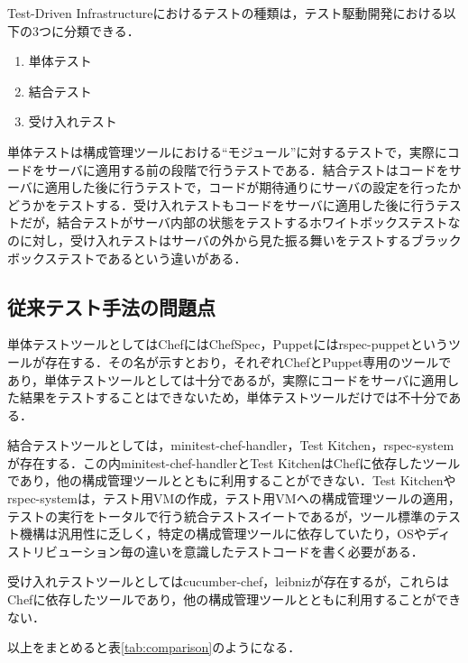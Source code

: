 Test-Driven Infrastructureにおけるテストの種類は，テスト駆動開発における以下の3つに分類できる．

\begin{enumerate}
  \item 単体テスト
  \item 結合テスト
  \item 受け入れテスト
\end{enumerate}

単体テストは構成管理ツールにおける``モジュール''に対するテストで，実際にコードをサーバに適用する前の段階で行うテストである．結合テストはコードをサーバに適用した後に行うテストで，コードが期待通りにサーバの設定を行ったかどうかをテストする．受け入れテストもコードをサーバに適用した後に行うテストだが，結合テストがサーバ内部の状態をテストするホワイトボックステストなのに対し，受け入れテストはサーバの外から見た振る舞いをテストするブラックボックステストであるという違いがある．

\subsection{従来テスト手法の問題点}

単体テストツールとしてはChefにはChefSpec，Puppetにはrspec-puppetというツールが存在する．その名が示すとおり，それぞれChefとPuppet専用のツールであり，単体テストツールとしては十分であるが，実際にコードをサーバに適用した結果をテストすることはできないため，単体テストツールだけでは不十分である．

結合テストツールとしては，minitest-chef-handler，Test Kitchen，rspec-systemが存在する．この内minitest-chef-handlerとTest KitchenはChefに依存したツールであり，他の構成管理ツールとともに利用することができない．Test Kitchenやrspec-systemは，テスト用VMの作成，テスト用VMへの構成管理ツールの適用，テストの実行をトータルで行う統合テストスイートであるが，ツール標準のテスト機構は汎用性に乏しく，特定の構成管理ツールに依存していたり，OSやディストリビューション毎の違いを意識したテストコードを書く必要がある．

受け入れテストツールとしてはcucumber-chef，leibnizが存在するが，これらはChefに依存したツールであり，他の構成管理ツールとともに利用することができない．

以上をまとめると表\ref{tab:comparison}のようになる．

